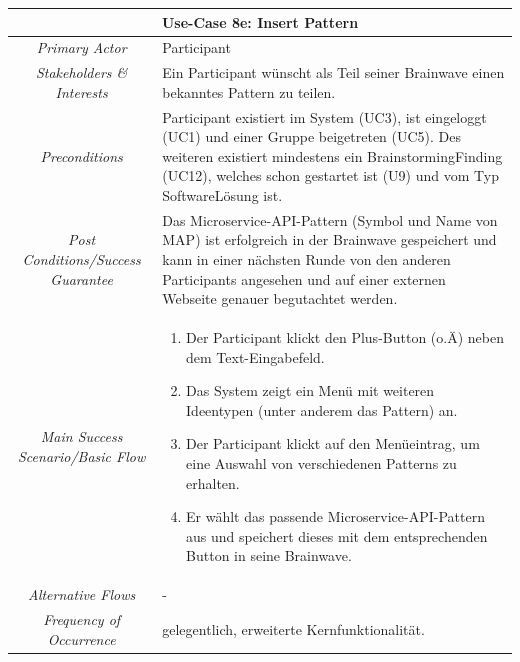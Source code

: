 \renewcommand{\arraystretch}{1.35}
\begin{center}
	\begin{longtable}{| c | p{7cm} |}
		\hline
		\multicolumn{2}{|c|}{\textbf{Use-Case 8e: Insert Pattern}}\\
		\hline\hline
		\textit{Primary Actor} & Participant\\
		\hline
		\textit{Stakeholders \& Interests} & Ein Participant wünscht als Teil seiner Brainwave einen bekanntes Pattern zu teilen. \\
		\hline
		\textit{Preconditions} & Participant existiert im System (UC3), ist eingeloggt (UC1) und einer Gruppe beigetreten (UC5). Des weiteren existiert mindestens ein BrainstormingFinding (UC12), welches schon gestartet ist (U9) und vom Typ SoftwareLösung ist.\\
		\hline
		\textit{Post Conditions/Success Guarantee} & Das Microservice-API-Pattern (Symbol und Name von MAP\cite{microservices-api}) ist erfolgreich in der Brainwave gespeichert und kann in einer nächsten Runde von den anderen Participants angesehen und auf einer externen Webseite genauer begutachtet werden.\\
		\hline
		\textit{Main Success Scenario/Basic Flow} & 
		\begin{enumerate}[noitemsep]
			\item Der Participant klickt den Plus-Button (o.Ä) neben dem Text-Eingabefeld.
			\item Das System zeigt ein Menü mit weiteren Ideentypen (unter anderem das Pattern) an.
			\item Der Participant klickt auf den Menüeintrag, um eine Auswahl von verschiedenen Patterns zu erhalten.
			\item Er wählt das passende Microservice-API-Pattern aus und speichert dieses mit dem entsprechenden Button in seine Brainwave.
		\end{enumerate}\\
		\hline
		\textit{Alternative Flows} &
		-\\
		\hline
		\textit{Frequency of Occurrence} & gelegentlich, erweiterte Kernfunktionalität.\\
		\hline
	\end{longtable}
\end{center}

